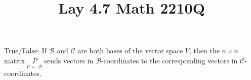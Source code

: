 \documentclass{ximera}
\begin{document}
  	\title{Lay 4.7  \hfill Math 2210Q} 
  	  		    \begin{question} True/False: If $\mathcal{B}$ and $\mathcal{C}$ are both bases of the vector space $V$, then the $n\times n$ matrix $
  	  		    	\underset{\mathcal{C}\leftarrow \mathcal{B}}{P}$ sends vectors in $\mathcal{B}$-coordinates to the corresponding vectors in $\mathcal{C}$-coordinates.
  	  		    	
  	  		    	\begin{multipleChoice}
  	  		    	\end{multipleChoice}
  	  		    	
  	  		    \end{question}	
\end{document}
